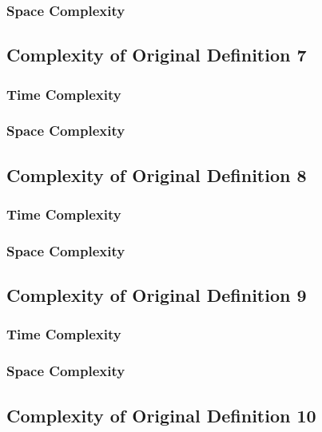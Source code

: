 \documentclass[conference]{IEEEtran}
\begin{document}
\subsubsection{Space Complexity}

\subsection{Complexity of Original Definition 7}

\subsubsection{Time Complexity}

\subsubsection{Space Complexity}

\subsection{Complexity of Original Definition 8}

\subsubsection{Time Complexity}

\subsubsection{Space Complexity}

\subsection{Complexity of Original Definition 9}

\subsubsection{Time Complexity}

\subsubsection{Space Complexity}

\subsection{Complexity of Original Definition 10}
\end{document}
